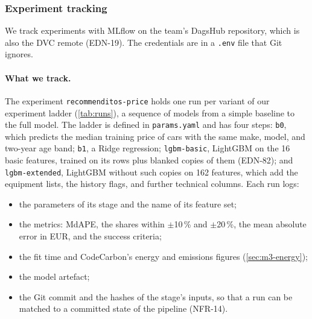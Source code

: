 
\subsubsection{Experiment tracking}
\label{sec:m2-experiment-tracking}

We track experiments with MLflow on the team's DagsHub repository, which is also the DVC remote (EDN-19).
The credentials are in a \texttt{.env} file that Git ignores.

\paragraph{What we track.}
The experiment \texttt{recommenditos-price} holds one run per variant of our experiment ladder (\cref{tab:runs}), a sequence of models from a simple baseline to the full model.
The ladder is defined in \texttt{params.yaml} and has four steps: \texttt{b0}, which predicts the median training price of cars with the same make, model, and two-year age band; \texttt{b1}, a Ridge regression; \texttt{lgbm-basic}, LightGBM on the 16 basic features, trained on its rows plus blanked copies of them (EDN-82); and \texttt{lgbm-extended}, LightGBM without such copies on 162 features, which add the equipment lists, the history flags, and further technical columns.
Each run logs:

\begin{itemize}
  \item the parameters of its stage and the name of its feature set;
  \item the metrics: MdAPE, the shares within $\pm$10\,\% and $\pm$20\,\%, the mean absolute error in EUR, and the success criteria;
  \item the fit time and CodeCarbon's energy and emissions figures (\cref{sec:m3-energy});
  \item the model artefact;
  \item the Git commit and the hashes of the stage's inputs, so that a run can be matched to a committed state of the pipeline (NFR-14).
\end{itemize}

